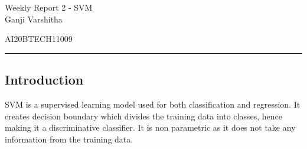 \documentclass[12pt,letterpaper, onecolumn]{exam}
\begin{document}
\newtheorem{theorem}{Theorem}[section]
\newtheorem{problem}{Problem}
\newtheorem{proposition}{Proposition}[section]
\newtheorem{lemma}{Lemma}[section]
\newtheorem{corollary}[theorem]{Corollary}
\newtheorem{example}{Example}[section]
\newtheorem{definition}[problem]{Definition}

\newcommand{\BEQA}{\begin{eqnarray}}
\newcommand{\EEQA}{\end{eqnarray}}
\newcommand{\define}{\stackrel{\triangle}{=}}

\raggedbottom
\setlength{\parindent}{0pt}
\providecommand{\mbf}{\mathbf}
\providecommand{\norm}[1]{\lVert#1\rVert}
\providecommand{\pr}[1]{\ensuremath{\Pr\left(#1\right)}}
\providecommand{\qfunc}[1]{\ensuremath{Q\left(#1\right)}}
\providecommand{\sbrak}[1]{\ensuremath{{}\left[#1\right]}}
\providecommand{\lsbrak}[1]{\ensuremath{{}\left[#1\right.}}
\providecommand{\rsbrak}[1]{\ensuremath{{}\left.#1\right]}}
\providecommand{\brak}[1]{\ensuremath{\left(#1\right)}}
\providecommand{\lbrak}[1]{\ensuremath{\left(#1\right.}}
\providecommand{\rbrak}[1]{\ensuremath{\left.#1\right)}}
\providecommand{\cbrak}[1]{\ensuremath{\left\{#1\right\}}}
\providecommand{\lcbrak}[1]{\ensuremath{\left\{#1\right.}}
\providecommand{\rcbrak}[1]{\ensuremath{\left.#1\right\}}}
\let\vec\mathbf




\begingroup  
    \centering
    
    \LARGE Weekly Report 2 - SVM\\[0.5em]
    
    \large Ganji Varshitha\par
    \large AI20BTECH11009\par
\endgroup
\rule{\textwidth}{0.4pt}
\pointsdroppedatright   %
\printanswers
\newcommand\Solution{
  \textbf{Solution:}\\}
\newcommand{\myvec}[1]{\ensuremath{\begin{bmatrix}#1\end{bmatrix}}}

 \subsection*{Introduction}
SVM is a supervised learning model used for both classification and regression. It creates decision boundary which divides the training data into classes, hence making it a discriminative classifier.
It is non parametric as it does not take any information from the training data.
\end{document}
